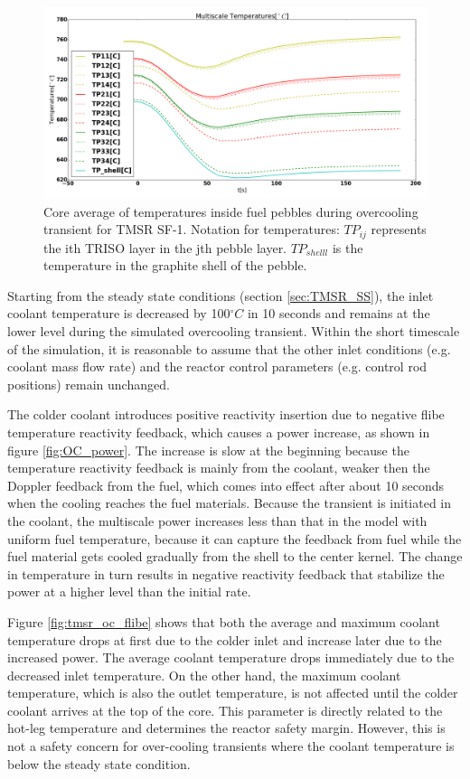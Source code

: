 \documentclass{elsarticle}
\begin{document}
\begin{figure}
    \centering
    \includegraphics[width=\textwidth]{images/diffusion/tmsr/OC/compare_multiscale/temps.png}
    \caption{Core average of temperatures inside fuel pebbles during overcooling transient for TMSR SF-1. Notation for temperatures: $TP_{ij}$ represents the ith TRISO layer in the jth pebble layer. $TP_{shelll}$ is the temperature in the graphite shell of the pebble.}
    \label{fig:temps_OC_tmsr}
\end{figure}


Starting from the steady state conditions (section \ref{sec:TMSR_SS}), the inlet coolant temperature is decreased by 100$^{\circ}C$ in 10 seconds and remains at the lower level during the simulated overcooling transient. Within the short timescale of the simulation, it is reasonable to assume that the other inlet conditions (e.g. coolant mass flow rate) and the reactor control parameters (e.g. control rod positions) remain unchanged. 

The colder coolant introduces positive reactivity insertion due to negative flibe temperature reactivity feedback, which causes a power increase, as shown in figure \ref{fig:OC_power}. The increase is slow at the beginning because the temperature reactivity feedback is mainly from the coolant, weaker then the Doppler feedback from the fuel, which comes into effect after about 10 seconds when the cooling reaches the fuel materials. 
Because the transient is initiated in the coolant, the multiscale power increases less than that in the model with uniform fuel temperature, because it can capture the feedback from fuel while the fuel material gets cooled gradually from the shell to the center kernel.
The change in temperature in turn results in  negative reactivity feedback that stabilize the power at a higher level than the initial rate. 

Figure \ref{fig:tmsr_oc_flibe} shows that both the average and maximum coolant temperature drops at first due to the colder inlet and increase later due to the increased power.
The average coolant temperature drops immediately due to the decreased inlet temperature. 
On the other hand, the maximum coolant temperature, which is also the outlet temperature, is not affected until the colder coolant arrives at the top of the core. This parameter is directly related to the hot-leg temperature and determines the reactor safety margin. However, this is not a safety concern for over-cooling transients where the coolant temperature is below the steady state condition. 
\end{document}
